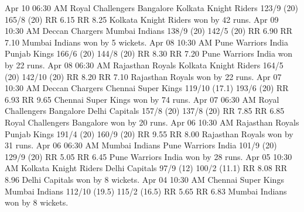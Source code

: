 Apr 10
06:30 AM
Royal Challengers Bangalore
Kolkata Knight Riders
123/9 (20)
165/8 (20)
RR 6.15
RR 8.25
Kolkata Knight Riders won by 42 runs.
Apr 09
10:30 AM
Deccan Chargers
Mumbai Indians
138/9 (20)
142/5 (20)
RR 6.90
RR 7.10
Mumbai Indians won by 5 wickets.
Apr 08
10:30 AM
Pune Warriors India
Punjab Kings
166/6 (20)
144/8 (20)
RR 8.30
RR 7.20
Pune Warriors India won by 22 runs.
Apr 08
06:30 AM
Rajasthan Royals
Kolkata Knight Riders
164/5 (20)
142/10 (20)
RR 8.20
RR 7.10
Rajasthan Royals won by 22 runs.
Apr 07
10:30 AM
Deccan Chargers
Chennai Super Kings
119/10 (17.1)
193/6 (20)
RR 6.93
RR 9.65
Chennai Super Kings won by 74 runs.
Apr 07
06:30 AM
Royal Challengers Bangalore
Delhi Capitals
157/8 (20)
137/8 (20)
RR 7.85
RR 6.85
Royal Challengers Bangalore won by 20 runs.
Apr 06
10:30 AM
Rajasthan Royals
Punjab Kings
191/4 (20)
160/9 (20)
RR 9.55
RR 8.00
Rajasthan Royals won by 31 runs.
Apr 06
06:30 AM
Mumbai Indians
Pune Warriors India
101/9 (20)
129/9 (20)
RR 5.05
RR 6.45
Pune Warriors India won by 28 runs.
Apr 05
10:30 AM
Kolkata Knight Riders
Delhi Capitals
97/9 (12)
100/2 (11.1)
RR 8.08
RR 8.96
Delhi Capitals won by 8 wickets.
Apr 04
10:30 AM
Chennai Super Kings
Mumbai Indians
112/10 (19.5)
115/2 (16.5)
RR 5.65
RR 6.83
Mumbai Indians won by 8 wickets.